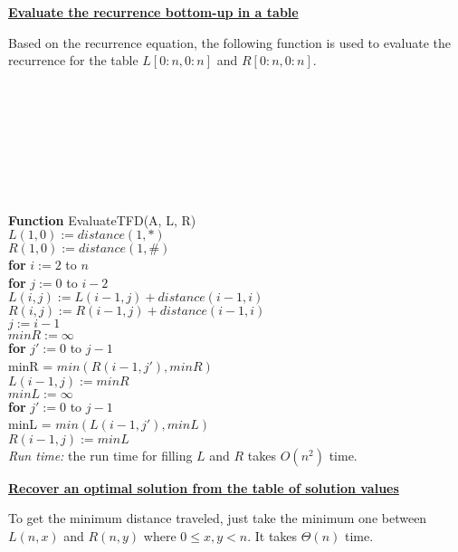 \documentclass[11pt]{article}
\begin{document}
\begin{enumerate}
  \underline{\textbf{Evaluate the recurrence bottom-up in a table}}
 
  Based on the recurrence equation, the following function is used to
  evaluate the recurrence for the table $L[0:n, 0:n]$ and $R[0:n, 0:n]$.\\\\\\\\\\\\\\\\\\

  \textbf{Function} EvaluateTFD(A, L, R) \\
  \-\hspace{2em} $L(1,0) := distance(1, *)$ \\
  \-\hspace{2em} $R(1,0) := distance(1, \#)$ \\
  \-\hspace{2em} \textbf{for} $i := 2$ to $n$ \\
  \-\hspace{4em} \textbf{for} $j := 0$ to $i-2$ \\
  \-\hspace{6em} $L(i,j) := L(i-1, j) + distance(i-1, i)$ \\
  \-\hspace{6em} $R(i,j) := R(i-1, j) + distance(i-1, i)$ \\
  \-\hspace{4em} $j := i - 1$ \\
  \-\hspace{4em} $minR := \infty$ \\
  \-\hspace{4em} \textbf{for} $j' := 0$ to $j-1$ \\
  \-\hspace{6em} minR = $min(R(i-1, j'), minR)$ \\
  \-\hspace{4em} $L(i-1,j) := minR$ \\
  \-\hspace{4em} $minL := \infty$ \\
  \-\hspace{4em} \textbf{for} $j' := 0$ to $j-1$ \\
  \-\hspace{6em} minL = $min(L(i-1, j'), minL)$ \\
  \-\hspace{4em} $R(i-1,j) := minL$ \\

  \emph{Run time:} the run time for filling $L$ and $R$ takes $O(n^2)$ time.

  \underline{\textbf{Recover an optimal solution from the table of
      solution values}}
  
  To get the minimum distance traveled, just take the minimum one
  between $L(n,x)$ and $R(n,y)$ where $0 \leq x,y < n$. It takes
  $\Theta(n)$ time.

\end{enumerate}
\end{document}
